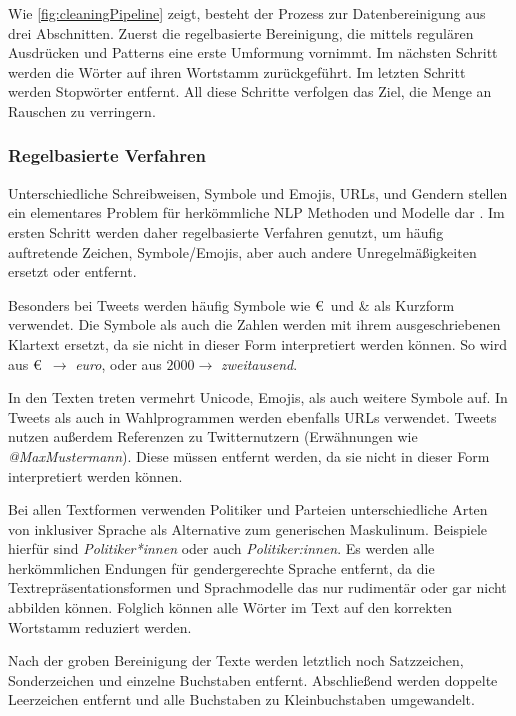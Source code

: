 Wie \autoref{fig:cleaningPipeline} zeigt, besteht der Prozess zur Datenbereinigung aus drei Abschnitten. Zuerst die regelbasierte Bereinigung, die mittels regulären Ausdrücken und Patterns eine erste Umformung vornimmt. Im nächsten Schritt werden die Wörter auf ihren Wortstamm zurückgeführt. Im letzten Schritt werden Stopwörter entfernt. All diese Schritte verfolgen das Ziel, die Menge an Rauschen zu verringern.

\subsubsection{Regelbasierte Verfahren}

Unterschiedliche Schreibweisen, Symbole und Emojis, \acp{URL}, und Gendern stellen ein elementares Problem für herkömmliche \ac{NLP} Methoden und Modelle dar \autocite[4\psq]{kowsari_text_2019}. Im ersten Schritt werden daher regelbasierte Verfahren genutzt, um häufig auftretende Zeichen, Symbole/Emojis, aber auch andere Unregelmäßigkeiten ersetzt oder entfernt.

Besonders bei Tweets werden häufig Symbole wie \euro~und \& als Kurzform verwendet. Die Symbole als auch die Zahlen werden mit ihrem ausgeschriebenen Klartext ersetzt, da sie nicht in dieser Form interpretiert werden können. So wird aus \euro~\(\rightarrow\) \textit{euro}, oder aus \(\num{2000} \rightarrow\) \textit{zweitausend}.

In den Texten treten vermehrt Unicode, Emojis, als auch weitere Symbole auf. In Tweets als auch in Wahlprogrammen werden ebenfalls \acp{URL} verwendet. Tweets nutzen außerdem Referenzen zu Twitternutzern (Erwähnungen wie \textit{@MaxMustermann}). Diese müssen entfernt werden, da sie nicht in dieser Form interpretiert werden können.

Bei allen Textformen verwenden Politiker und Parteien unterschiedliche Arten von inklusiver Sprache als Alternative zum generischen Maskulinum. Beispiele hierfür sind \textit{Politiker*innen} oder auch \textit{Politiker:innen}. Es  werden alle herkömmlichen Endungen für gendergerechte Sprache entfernt, da die Textrepräsentationsformen und Sprachmodelle das nur rudimentär oder gar nicht abbilden können. Folglich können alle Wörter im Text auf den korrekten Wortstamm reduziert werden.

Nach der groben Bereinigung der Texte werden letztlich noch Satzzeichen, Sonderzeichen und einzelne Buchstaben entfernt. Abschließend werden doppelte Leerzeichen entfernt und alle Buchstaben zu Kleinbuchstaben umgewandelt.

